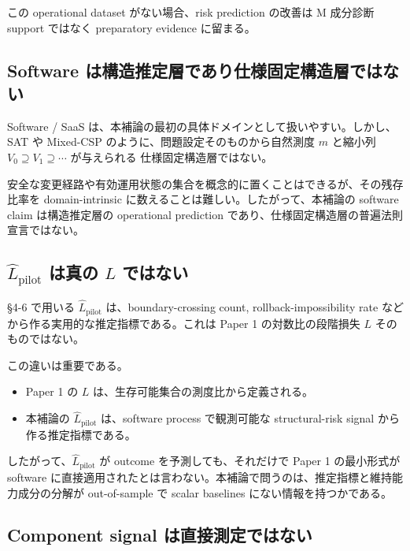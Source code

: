 \documentclass[12pt,a4paper]{article}
\begin{document}
この operational dataset がない場合、risk prediction の改善は M 成分診断 support ではなく preparatory evidence に留まる。

\subsection{Software は構造推定層であり仕様固定構造層ではない}\label{software-ux306fux69cbux9020ux63a8ux5b9aux5c64ux3067ux3042ux308aux4ed5ux69d8ux56faux5b9aux69cbux9020ux5c64ux3067ux306fux306aux3044}

Software / SaaS は、本補論の最初の具体ドメインとして扱いやすい。しかし、SAT や Mixed-CSP のように、問題設定そのものから自然測度 \(m\) と縮小列 \(V_0 \supseteq V_1 \supseteq \cdots\) が与えられる 仕様固定構造層ではない。

安全な変更経路や有効運用状態の集合を概念的に置くことはできるが、その残存比率を domain-intrinsic に数えることは難しい。したがって、本補論の software claim は構造推定層の operational prediction であり、仕様固定構造層の普遍法則宣言ではない。

\subsection{\texorpdfstring{\(\hat L_{\mathrm{pilot}}\) は真の \(L\) ではない}{\textbackslash hat L\_\{\textbackslash mathrm\{pilot\}\} は真の L ではない}}\label{hat-l_mathrmpilot-ux306fux771fux306e-l-ux3067ux306fux306aux3044}

§4-6 で用いる \(\hat L_{\mathrm{pilot}}\) は、boundary-crossing count, rollback-impossibility rate などから作る実用的な推定指標である。これは Paper 1 の対数比の段階損失 \(L\) そのものではない。

この違いは重要である。

\begin{itemize}
\tightlist
\item
  Paper 1 の \(L\) は、生存可能集合の測度比から定義される。
\item
  本補論の \(\hat L_{\mathrm{pilot}}\) は、software process で観測可能な structural-risk signal から作る推定指標である。
\end{itemize}

したがって、\(\hat L_{\mathrm{pilot}}\) が outcome を予測しても、それだけで Paper 1 の最小形式が software に直接適用されたとは言わない。本補論で問うのは、推定指標と維持能力成分の分解が out-of-sample で scalar baselines にない情報を持つかである。

\subsection{Component signal は直接測定ではない}\label{component-signal-ux306fux76f4ux63a5ux6e2cux5b9aux3067ux306fux306aux3044}
\end{document}

